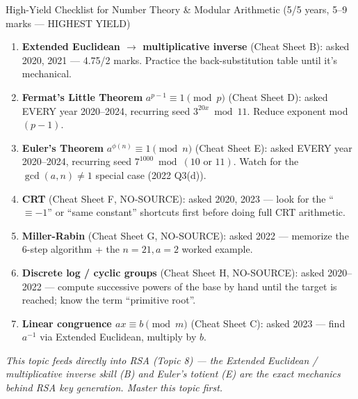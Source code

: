 \documentclass[12pt,a4paper]{article}
\begin{document}
\begin{keybox}{High-Yield Checklist for Number Theory \& Modular Arithmetic (5/5 years, 5--9 marks --- HIGHEST YIELD)}
\begin{enumerate}[noitemsep]
  \item \textbf{Extended Euclidean $\to$ multiplicative inverse} (Cheat Sheet B): asked 2020, 2021 --- 4.75/2 marks. Practice the back-substitution table until it's mechanical.
  \item \textbf{Fermat's Little Theorem} $a^{p-1}\equiv1\pmod p$ (Cheat Sheet D): asked EVERY year 2020--2024, recurring seed $3^{20x}\bmod11$. Reduce exponent mod $(p-1)$.
  \item \textbf{Euler's Theorem} $a^{\phi(n)}\equiv1\pmod n$ (Cheat Sheet E): asked EVERY year 2020--2024, recurring seed $7^{1000}\bmod(10\text{ or }11)$. Watch for the $\gcd(a,n)\neq1$ special case (2022 Q3(d)).
  \item \textbf{CRT} (Cheat Sheet F, NO-SOURCE): asked 2020, 2023 --- look for the ``$\equiv-1$'' or ``same constant'' shortcuts first before doing full CRT arithmetic.
  \item \textbf{Miller-Rabin} (Cheat Sheet G, NO-SOURCE): asked 2022 --- memorize the 6-step algorithm + the $n=21,a=2$ worked example.
  \item \textbf{Discrete log / cyclic groups} (Cheat Sheet H, NO-SOURCE): asked 2020--2022 --- compute successive powers of the base by hand until the target is reached; know the term ``primitive root''.
  \item \textbf{Linear congruence $ax\equiv b\pmod m$} (Cheat Sheet C): asked 2023 --- find $a^{-1}$ via Extended Euclidean, multiply by $b$.
\end{enumerate}
\textit{This topic feeds directly into RSA (Topic 8) --- the Extended Euclidean / multiplicative inverse skill (B) and Euler's totient (E) are the exact mechanics behind RSA key generation. Master this topic first.}
\end{keybox}
\end{document}
